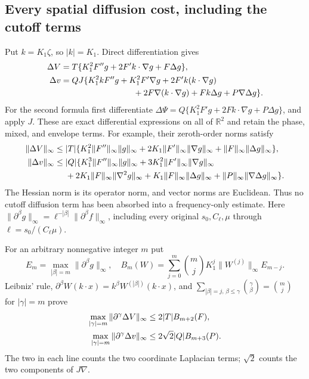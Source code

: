 \subsection{Every spatial diffusion cost, including the cutoff terms}
Put $k=K_1\zeta$, so $|k|=K_1$. Direct differentiation gives
\begin{align}
 \Delta V={}&T\{K_1^2F''g+2F'k\cdot\nabla g+F\Delta g\},
 \label{cvlane:eq:lapV}\\
 \Delta v={}&QJ\{K_1^2kF''g+K_1^2F'\nabla g
 +2F'k(k\cdot\nabla g)\notag\\
 &\hspace{26mm}+2F\nabla(k\cdot\nabla g)
 +Fk\Delta g+P\nabla\Delta g\}.
 \label{cvlane:eq:lapv}
\end{align}
For the second formula first differentiate
$\Delta\Psi=Q\{K_1^2F'g+2F k\cdot\nabla g+P\Delta g\}$,
and apply $J$. These are exact differential expressions on all
of $\mathbb R^2$ and retain the phase, mixed, and envelope terms.
For example, their zeroth-order norms satisfy
\begin{align}
 \|\Delta V\|_\infty\leq{}&|T|\{
 K_1^2\|F''\|_\infty\|g\|_\infty
 +2K_1\|F'\|_\infty\|\nabla g\|_\infty
 +\|F\|_\infty\|\Delta g\|_\infty\},\notag\\
 \|\Delta v\|_\infty\leq{}&|Q|\{
 K_1^3\|F''\|_\infty\|g\|_\infty
 +3K_1^2\|F'\|_\infty\|\nabla g\|_\infty\notag\\
 &+2K_1\|F\|_\infty\|\nabla^2g\|_\infty
 +K_1\|F\|_\infty\|\Delta g\|_\infty
 +\|P\|_\infty\|\nabla\Delta g\|_\infty\}.
 \label{cvlane:eq:zerocosts}
\end{align}
The Hessian norm is its operator norm, and vector norms are Euclidean.
Thus no cutoff diffusion term has been absorbed into a frequency-only
estimate. Here $\|\partial^\beta g\|_\infty
=\ell^{-|\beta|}\|\partial^\beta f\|_\infty$, including every
original $s_0,C_\ell,\mu$ through $\ell=s_0/(C_\ell\mu)$.

For an arbitrary nonnegative integer $m$ put
\[
 E_m=\max_{|\beta|=m}\|\partial^\beta g\|_\infty,
 \quad B_m(W)=\sum_{j=0}^m\binom mj
 K_1^j\|W^{(j)}\|_\infty E_{m-j}.
\]
Leibniz' rule, $\partial^\beta W(k\cdot x)=k^\beta
W^{(|\beta|)}(k\cdot x)$, and
$\sum_{|\beta|=j,\,\beta\leq\gamma}\binom\gamma\beta
=\binom mj$ for $|\gamma|=m$ prove
\begin{align}
 \max_{|\gamma|=m}\|\partial^\gamma\Delta V\|_\infty
 &\leq2|T|B_{m+2}(F),\notag\\
 \max_{|\gamma|=m}\|\partial^\gamma\Delta v\|_\infty
 &\leq2\sqrt2|Q|B_{m+3}(P).
 \label{cvlane:eq:allspacecosts}
\end{align}
The two in each line counts the two coordinate Laplacian terms;
$\sqrt2$ counts the two components of $J\nabla$.

